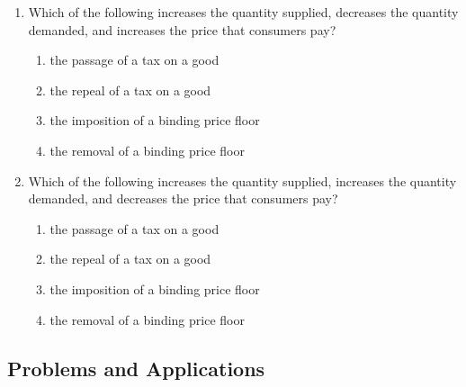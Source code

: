 \documentclass{article}
\begin{document}
\begin{enumerate}
\item Which of the following increases the quantity supplied, decreases the quantity demanded, and increases the price that consumers pay?

	\begin{enumerate}
	
	\item the passage of a tax on a good
	
	\item the repeal of a tax on a good
	
	\item the imposition of a binding price floor
	
	\item the removal of a binding price floor
	
	\end{enumerate}	
	
\item Which of the following increases the quantity supplied, increases the quantity demanded, and decreases the price that consumers pay?

	\begin{enumerate}
	
	\item the passage of a tax on a good
	
	\item the repeal of a tax on a good
	
	\item the imposition of a binding price floor
	
	\item the removal of a binding price floor
	
	\end{enumerate}

\end{enumerate}

\subsection*{Problems and Applications}
\end{document}
